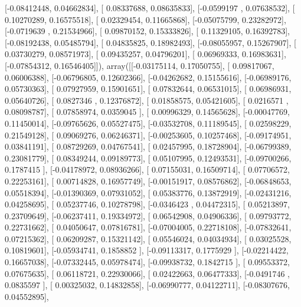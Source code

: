 \documentclass{article}
\begin{document}
       [-0.08412448,  0.04662834],
       [ 0.08337688,  0.08635833],
       [-0.0599197 ,  0.07638532],
       [ 0.10270289,  0.16575518],
       [ 0.02329454,  0.11665868],
       [-0.05075799,  0.23282972],
       [-0.0719639 ,  0.21534966],
       [ 0.09870152,  0.15333826],
       [ 0.11329105,  0.16392783],
       [-0.08192438,  0.05485794],
       [ 0.04835825,  0.18982493],
       [-0.08055957,  0.15267907],
       [ 0.03730279,  0.08571973],
       [ 0.09435257,  0.04796201],
       [ 0.06969333,  0.16983631],
       [-0.07854312,  0.16546405]]), array([[-0.03175114,  0.17050755],
       [ 0.09817067,  0.06006388],
       [-0.06796805,  0.12602366],
       [-0.04262682,  0.15155616],
       [-0.06989176,  0.05730363],
       [ 0.07927959,  0.15901651],
       [ 0.07832644,  0.06531015],
       [ 0.06986931,  0.05640726],
       [ 0.0827346 ,  0.12376872],
       [ 0.01858575,  0.05421605],
       [ 0.0216571 ,  0.08098787],
       [ 0.07858974,  0.0359045 ],
       [ 0.00996329,  0.14565628],
       [-0.00047769,  0.11450014],
       [-0.09765626,  0.05527475],
       [-0.03532708,  0.11189545],
       [ 0.02598229,  0.21549128],
       [ 0.09069276,  0.06246371],
       [-0.00253605,  0.10257468],
       [-0.09174951,  0.03841191],
       [ 0.08729269,  0.04767541],
       [ 0.02457995,  0.18728904],
       [-0.06799389,  0.23081779],
       [ 0.08349244,  0.09189773],
       [ 0.05107995,  0.12493531],
       [-0.09700266,  0.1787415 ],
       [-0.04178972,  0.08936266],
       [ 0.07155031,  0.16509714],
       [ 0.07706572,  0.22253161],
       [ 0.00714828,  0.16957749],
       [-0.00151917,  0.08576862],
       [-0.06848653,  0.05518394],
       [-0.01390369,  0.07931052],
       [ 0.05383776,  0.13872919],
       [-0.02431216,  0.04258695],
       [ 0.05237746,  0.10278798],
       [-0.0346423 ,  0.04472315],
       [ 0.05213897,  0.23709649],
       [-0.06237411,  0.19334972],
       [ 0.06542908,  0.04906336],
       [ 0.09793772,  0.22731662],
       [ 0.04050647,  0.07816781],
       [-0.07004005,  0.22718108],
       [-0.07832641,  0.07215362],
       [ 0.06209287,  0.15321142],
       [ 0.05546024,  0.04034934],
       [ 0.03025528,  0.10819601],
       [-0.05934741,  0.1858852 ],
       [-0.09113317,  0.1775929 ],
       [-0.02214422,  0.16657038],
       [-0.07332445,  0.05978474],
       [-0.09938732,  0.1842715 ],
       [ 0.09553372,  0.07675635],
       [ 0.06118721,  0.22930066],
       [ 0.02422663,  0.06477333],
       [-0.0491746 ,  0.0835597 ],
       [ 0.00325032,  0.14832858],
       [-0.06990777,  0.04122711],
       [-0.08307676,  0.04552895],
\end{document}
